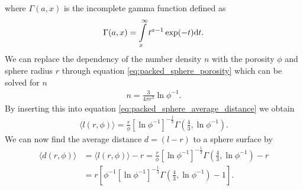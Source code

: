 where $\Gamma(a,x)$ is the incomplete gamma function defined as
\begin{align}
	\Gamma(a,x) = \int\limits_x^\infty t^{a-1}\exp(-t)\mathrm{d}t.
\end{align}
We can replace the dependency of the number density $n$ with the porosity $\phi$ and sphere radius $r$ through equation \eqref{eq:packed_sphere_porosity} which can be solved for $n$
\begin{align}
	n = \frac{3}{4\pi r^3} \ln\phi^{-1}.
\end{align}
By inserting this into equation \eqref{eq:packed_sphere_average_distance} we obtain
\begin{align}
	\langle l(r,\phi) \rangle = \frac{r}{\phi}\left[\ln\phi^{-1}\right]^{-\frac{1}{3}}\Gamma\left(\frac{4}{3},\ln\phi^{-1}\right).
\end{align}
We can now find the average distance $d=(l-r)$ to a sphere surface by
\begin{align}
	\langle d(r,\phi)\rangle &= \langle l(r,\phi)\rangle - r = \frac{r}{\phi}\left[\ln\phi^{-1}\right]^{-\frac{1}{3}}\Gamma\left(\frac{4}{3},\ln\phi^{-1}\right) - r\\
	&= r\left[\phi^{-1}\left[\ln\phi^{-1}\right]^{-\frac{1}{3}}\Gamma\left(\frac{4}{3},\ln\phi^{-1}\right) - 1\right].
\end{align}


